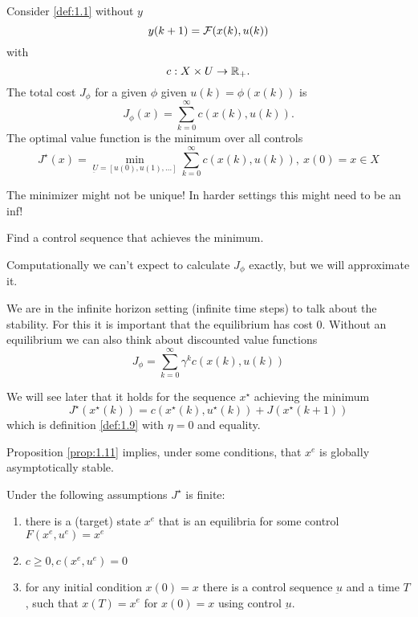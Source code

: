Consider \ref{def:1.1} without \(y\)
\[y(k+1)=\mathcal{F}(x(k),u(k))\]
with \[c:X\times U\to \mathbb{R}_+.\]
The total cost \(J_\phi\) for a given \(\phi\) given 
\(u(k)=\phi(x(k))\) is 
\[J_\phi(x)=\sum_{k=0}^\infty c(x(k),u(k)).\]
The optimal value function is the minimum over all controls 
\begin{equation}\label{eq:OCP}
    J^\star(x)=\min_{\underbar{U}=[u(0),u(1),\dots]} \sum_{k=0}^\infty c(x(k),u(k)),\ x(0)=x\in X
\end{equation}

\begin{remark}
    The minimizer might not be unique! In harder settings this might need to be an inf!
\end{remark}

 Find a control sequence that achieves the minimum. 

Computationally we can't expect to calculate \(J_\phi\) exactly, but we will approximate it. 
\begin{remark}
    We are in the infinite horizon setting (infinite time steps) to talk about the stability. For this it is important 
    that the equilibrium has cost \(0\). Without an equilibrium we can also think about discounted value functions \[J_\phi=\sum_{k=0}^\infty \gamma^k c(x(k),u(k))\]
\end{remark}

We will see later that it holds for the sequence \(x^\star\) achieving the minimum 
\[J^\star(x^\star(k))=c(x^\star(k),u^\star(k))+J(x^\star(k+1))\]
which is definition \ref{def:1.9} with \(\eta=0\) and equality.

Proposition \ref{prop:1.11} implies, under some conditions, that \(x^e\)
is globally asymptotically stable.

Under the following assumptions \(J^\star\) is finite:
\begin{enumerate} %
    \item there is a (target) state \(x^e\) that is an equilibria for some control \(F(x^e,u^e)=x^e\)
    \item \(c\geq 0,c(x^e,u^e)=0\)
    \item for any initial condition \(x(0)=x\) there is a control sequence \(\underbar{u}\) and a time \(T\), such that \(x(T)=x^e\) for \(x(0)=x\) using control \(\underbar{u}\).
\end{enumerate}

